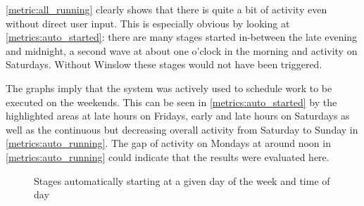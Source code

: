 \autoref{metric:all_running} clearly shows that there is quite a bit of activity even without direct user input.
This is especially obvious by looking at \autoref{metrics:auto_started}: there are many stages started in-between the late evening and midnight, a second wave at about one o'clock in the morning and activity on Saturdays.
Without Winslow these stages would not have been triggered.

The graphs imply that the system was actively used to schedule work to be executed on the weekends.
This can be seen in \autoref{metrics:auto_started} by the highlighted areas at late hours on Fridays, early and late hours on Saturdays as well as the continuous but decreasing overall activity from Saturday to Sunday in \autoref{metrics:auto_running}.
The gap of activity on Mondays at around noon in \autoref{metrics:auto_running} could indicate that the results were evaluated here.

\begin{figure}[H]
	\centering
	\caption{Stages automatically starting at a given day of the week and time of day}
	\label{metrics:auto_started}
\end{figure}




